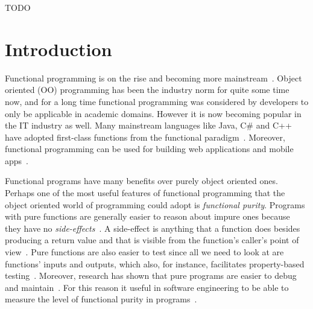 \documentclass[a4paper,12pt]{article}
\begin{document}
\begin{sammanfattning}
  TODO
\end{sammanfattning}

\tableofcontents


\cleardoublepage

\mainmatter

\section{Introduction} \label{sec:Introduction}


Functional programming is on the rise and becoming more mainstream~\cite{intertech}. Object oriented (OO) programming has been the industry norm for quite some time now, and for a long time functional programming was considered by developers to only be applicable in academic domains. However it is now becoming popular in the IT industry as well. Many mainstream languages like Java, C\# and C++ have adopted first-class functions from the functional paradigm~\cite{intertech}. Moreover, functional programming can be used for building web applications and mobile apps~\cite{jonas-walter}.

Functional programs have many benefits over purely object oriented ones. Perhaps one of the most useful features of functional programming that the object oriented world of programming could adopt is \textit{functional purity}. Programs with pure functions are generally easier to reason about impure ones because they have no \textit{side-effects}~\cite{alvin-alexander}. A side-effect is anything that a function does besides producing a return value and that is visible from the function's caller's point of view~\cite{purity-in-javascript}. Pure functions are also easier to test since all we need to look at are functions' inputs and outputs, which also, for instance, facilitates property-based testing~\cite{alvin-alexander}. Moreover, research has shown that pure programs are easier to debug and maintain~\cite{purity-in-javascript}. %
For this reason it useful in software engineering to be able to measure the level of functional purity in programs~\cite{purity-in-javascript}.
\end{document}
